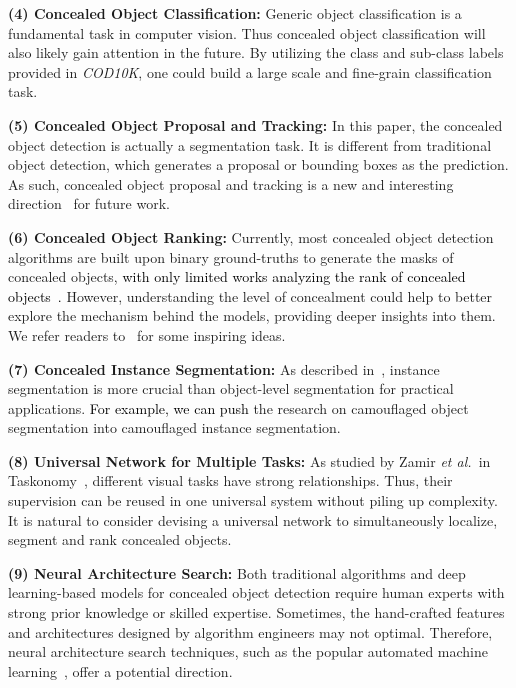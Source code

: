 \documentclass[10pt,journal,compsoc]{IEEEtran}
\def\etal{{\em et al.~}}
\newcommand{\Rev}[1]{\textcolor{black}{#1}}
\def\ourdataset{\textit{COD10K}}
\begin{document}
\textbf{(4) Concealed Object Classification:} 
Generic object  classification is a fundamental task in computer vision. 
Thus concealed object classification will also likely gain attention 
in the future. 
By utilizing the class and sub-class labels provided in \ourdataset, 
one could build a large scale and fine-grain classification task. 

\textbf{(5) Concealed Object Proposal and Tracking:} 
In this paper, the concealed object detection is actually a segmentation task. 
It is different from traditional object detection, 
which generates a proposal or bounding boxes as the prediction. 
As such, concealed object proposal and tracking is a new and 
interesting direction~\cite{mondal2020camouflaged} for future work.

\textbf{(6) Concealed Object Ranking:} 
Currently, most concealed object detection algorithms are built upon binary ground-truths to generate the masks of concealed objects, 
\Rev{with only limited works analyzing the rank of concealed objects~\cite{zhai2021Mutual}.} %
However, understanding the level of concealment could help to better 
explore the mechanism behind the models, providing deeper insights into them. We refer readers to~\cite{kalash2019relative,zhai2021Mutual} for some inspiring ideas.

\textbf{(7) Concealed Instance Segmentation:} 
As described in~\cite{li2017instance}, 
instance segmentation is more crucial than object-level segmentation 
for practical applications.
\Rev{For example, we can push} the research 
on camouflaged object segmentation into camouflaged instance segmentation. 

\textbf{(8) Universal Network for Multiple Tasks:}
As studied by Zamir \etal in Taskonomy~\cite{zamir2018taskonomy}, 
different visual tasks have strong relationships. 
Thus, their supervision can be reused in one universal system without 
piling up complexity. It is natural to consider devising a universal network 
to simultaneously localize, segment and rank concealed objects. 
 
\textbf{(9) Neural Architecture Search:} 
Both traditional algorithms and deep learning-based models for concealed 
object detection require human experts with strong prior knowledge 
or skilled expertise. 
Sometimes, the hand-crafted features and architectures designed by 
algorithm engineers may not optimal. 
Therefore, neural architecture search techniques, 
such as the popular automated machine learning~\cite{yao2018taking}, 
offer a potential direction.
\end{document}
